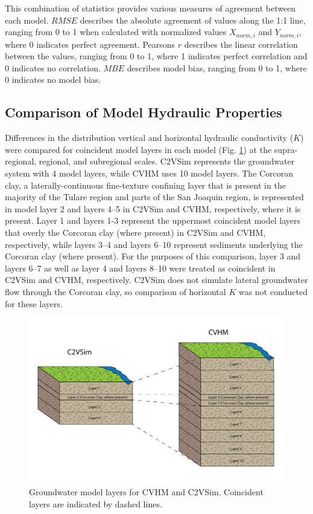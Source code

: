 This combination of statistics provides various measures of agreement between each model. $RMSE$ describes the absolute agreement of values along the 1:1 line, ranging from 0 to 1 when calculated with normalized values $X_{norm,i}$ and $Y_{norm,i}$, where 0 indicates perfect agreement. Pearsons $r$ describes the linear correlation between the values, ranging from 0 to 1, where 1 indicates perfect correlation and 0 indicates no correlation. $MBE$ describes model bias, ranging from 0 to 1, where 0 indicates no model bias.

\subsection{Comparison of Model Hydraulic Properties}

Differences in the distribution vertical and horizontal hydraulic conductivity ($K$) were compared for coincident model layers in each model (Fig. \ref{fig:ch3_model_layers}) at the supra-regional, regional, and subregional scales. C2VSim represents the groundwater system with 4 model layers, while CVHM uses 10 model layers. The Corcoran clay, a laterally-continuous fine-texture confining layer that is present in the majority of the Tulare region and parts of the San Joaquin region, is represented in model layer 2 and layers 4--5 in C2VSim and CVHM, respectively, where it is present. Layer 1 and layers 1-3 represent the uppermost coincident model layers that overly the Corcoran clay (where present) in C2VSim and CVHM, respectively, while layers 3--4 and layers 6--10 represent sediments underlying the Corcoran clay (where present). For the purposes of this comparison, layer 3 and layers 6--7 as well as layer 4 and layers 8--10 were treated as coincident in C2VSim and CVHM, respectively. C2VSim does not simulate lateral groundwater flow through the Corcoran clay, so comparison of horizontal $K$ was not conducted for these layers.

\begin{figure}[ht!]
\centerline{\includegraphics[width=140mm,keepaspectratio]{ch3_figs/GW_conceptualization.png}}
\caption{Groundwater model layers for CVHM and C2VSim. Coincident layers are indicated by dashed lines.}
\label{fig:ch3_model_layers}
\end{figure}

